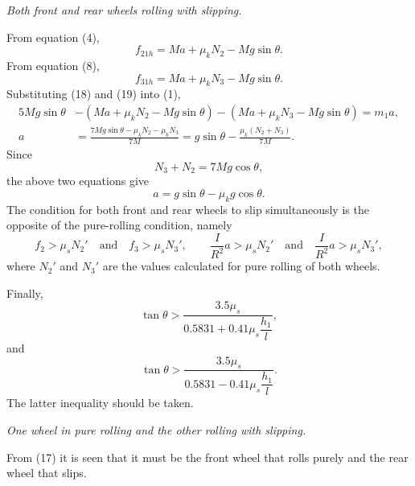 \emph{Both front and rear wheels rolling with slipping.}

From equation (4),
\begin{equation}
f_{21h}=Ma+\mu_kN_2-Mg\sin\theta. \tag{18}
\end{equation}
From equation (8),
\begin{equation}
f_{31h}=Ma+\mu_kN_3-Mg\sin\theta. \tag{19}
\end{equation}
Substituting (18) and (19) into (1),
\begin{align*}
5Mg\sin\theta&-(Ma+\mu_kN_2-Mg\sin\theta)-(Ma+\mu_kN_3-Mg\sin\theta)=m_1a,\\
a&=\frac{7Mg\sin\theta-\mu_kN_2-\mu_kN_3}{7M}
=g\sin\theta-\frac{\mu_k(N_2+N_3)}{7M}. \tag{20}
\end{align*}
Since
\[
N_3+N_2=7Mg\cos\theta,
\]
the above two equations give
\[
a=g\sin\theta-\mu_kg\cos\theta.
\]
The condition for both front and rear wheels to slip simultaneously is the opposite of the pure-rolling condition, namely
\begin{equation}
f_2>\mu_sN_2'\quad\text{and}\quad f_3>\mu_sN_3',
\qquad
\frac{I}{R^2}a>\mu_sN_2'\quad\text{and}\quad\frac{I}{R^2}a>\mu_sN_3', \tag{21}
\end{equation}
where $N_2'$ and $N_3'$ are the values calculated for pure rolling of both wheels.

Finally,
\[
\tan\theta>\frac{3.5\mu_s}{0.5831+0.41\mu_s\dfrac{h_1}{l}},
\]
and
\[
\tan\theta>\frac{3.5\mu_s}{0.5831-0.41\mu_s\dfrac{h_1}{l}}.
\]
The latter inequality should be taken.

\emph{One wheel in pure rolling and the other rolling with slipping.}

From (17) it is seen that it must be the front wheel that rolls purely and the rear wheel that slips.

